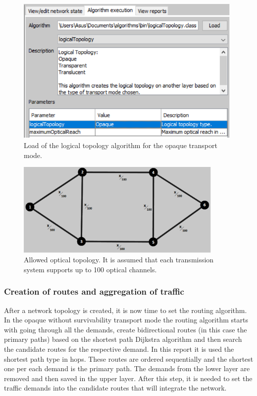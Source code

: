 \begin{figure}[H]
\centering
\includegraphics[width=11cm]{sdf/heuristic/opaque_survivability/figures/logical_topology_load_opaque}
\caption{Load of the logical topology algorithm for the opaque transport mode.}
\label{logical_topology_load_opaque_surv}
\end{figure}

\begin{figure}[H]
\centering
\includegraphics[width=10cm]{sdf/heuristic/opaque_survivability/figures/allowed_optical}
\caption{Allowed optical topology. It is assumed that each transmission system supports up to 100 optical channels.}
\label{allowed_optical_surv_opaque}
\end{figure}

\subsubsection{Creation of routes and aggregation of traffic}

\vspace{11pt}
After a network topology is created, it is now time to set the routing algorithm. In the opaque without survivability transport mode the routing algorithm starts with going through all the demands, create bidirectional routes (in this case the primary paths) based on the shortest path Dijkstra algorithm and then search the candidate routes for the respective demand. In this report it is used the shortest path type in hops. These routes are ordered sequentially and the shortest one per each demand is the primary path. The demands from the lower layer are removed and then saved in the upper layer. After this step, it is needed to set the traffic demands into the candidate routes that will integrate the network.

